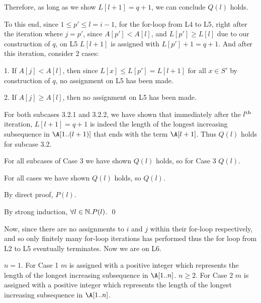 \documentclass[11pt, sakura, night, 1in]{hw}
\begin{document}
{{{{\begin{proofcases}
{{                            Therefore, as long as we show $L[l+1]=q+1$, we can conclude $Q(l)$ holds.

                            To this end, since $1\le p'\le l=i-1$, for the for-loop from L4 to L5, right after the iteration where $j=p'$, since $A[p']<A[l]$, and $L[p']\ge L[l]$ due to our construction of $q$, on L5 $L[l+1]$ is assigned with $L[p']+1=q+1$. And after this iteration, consider 2 cases:

                            1. If $A[j]<A[l]$, then since $L[x]\le L[p']=L[l+1]$ for all $x\in S'$ by construction of $q$, no assignment on L5 has been made.

                            2. If $A[j]\ge A[l]$, then no assignment on L5 has been made.

                            For both subcases 3.2.1 and 3.2.2, we have shown that immediately after the $l^{\text{th}}$ iteration, $L[l+1]=q+1$ is indeed the length of the longest increasing subsequence in $\A[1..(l+1)]$ that ends with the term $\A[l+1]$. Thus $Q(l)$ holds for subcase 3.2.
                        }
                    }

                    For all subcases of Case 3 we have shown $Q(l)$ holds, so for Case 3 $Q(l)$.
                \end{proofcases}

                For all cases we have shown $Q(l)$ holds, so $Q(l)$.
            }

            By direct proof, $P(l)$.
        }
    }

    By strong induction, $\forall l\in\mathbb{N}. P(l)$. \qed

    Now, since there are no assignments to $i$ and $j$ within their for-loop respectively, and so only finitely many for-loop iterations has performed thus the for loop from L2 to L5 eventually terminates. Now we are on L6.
    
    \begin{proofcases}
        \case $n=1$.
        For Case 1 $m$ is assigned with a positive integer which represents the length of the longest increasing subsequence in $\A[1..n]$.
        \case $n\ge2$.
        For Case 2 $m$ is assigned with a positive integer which represents the length of the longest increasing subsequence in $\A[1..n]$.
    \end{proofcases}

}
\end{document}
